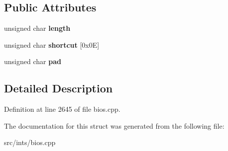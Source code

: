 \subsection*{Public Attributes}
\begin{DoxyCompactItemize}
\item 
\hypertarget{structpc98__func__key__shortcut__def_abaceed1a1548b1e78e9f5efce59e52db}{unsigned char {\bfseries length}}\label{structpc98__func__key__shortcut__def_abaceed1a1548b1e78e9f5efce59e52db}

\item 
\hypertarget{structpc98__func__key__shortcut__def_a073430a78271a50b611f35bd105253ab}{unsigned char {\bfseries shortcut} \mbox{[}0x0\-E\mbox{]}}\label{structpc98__func__key__shortcut__def_a073430a78271a50b611f35bd105253ab}

\item 
\hypertarget{structpc98__func__key__shortcut__def_a990a1f47feb6015883e885481702bd07}{unsigned char {\bfseries pad}}\label{structpc98__func__key__shortcut__def_a990a1f47feb6015883e885481702bd07}

\end{DoxyCompactItemize}


\subsection{Detailed Description}


Definition at line 2645 of file bios.\-cpp.



The documentation for this struct was generated from the following file\-:\begin{DoxyCompactItemize}
\item 
src/ints/bios.\-cpp\end{DoxyCompactItemize}
